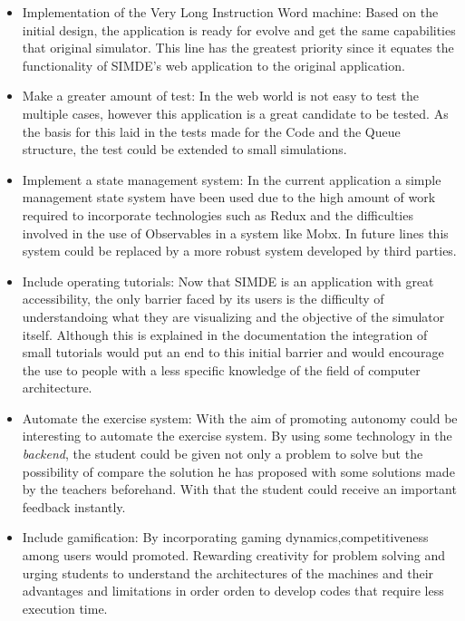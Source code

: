 \begin{itemize}

\item Implementation of the Very Long Instruction Word machine: Based on the initial design,
the application is ready for evolve and get the same capabilities that original simulator.
This line has the greatest priority since it equates the functionality of SIMDE's web application to
the original application.

\item Make a greater amount of test: In the web world is not easy to test 
 the multiple cases, however this application is a great candidate to be tested. 
As the basis for this laid in the tests made for the Code and the Queue structure,
the test could be extended to small simulations.

\item Implement a state management system: In the current application a simple management state system
have been used due to the high amount of work required to incorporate technologies such as Redux and 
the difficulties involved in the use of Observables in a system like Mobx. In future lines this system could be
replaced by a more robust system developed by third parties.

\item Include operating tutorials: Now that SIMDE is an application with great accessibility,
the only barrier faced by its users is the difficulty of understandoing what they are 
visualizing and the objective of the simulator itself. Although this is explained in the 
documentation the integration of small tutorials would put an end to this initial barrier
and would encourage the use to people with a less specific knowledge of the field
of computer architecture.

\item Automate the exercise system: With the aim of promoting autonomy could be interesting 
to automate the exercise system. By using some technology in the \textit{backend}, the student
could be given not only a problem to solve but the possibility of compare the solution 
he has proposed with some solutions made by the teachers beforehand. With that the student
could receive an important feedback instantly.

\item Include gamification: By incorporating gaming dynamics,competitiveness among users would promoted. 
Rewarding creativity for problem solving and urging students to understand the architectures 
of the machines and their advantages and limitations in order orden to develop codes 
that require less execution time.


\end{itemize}
